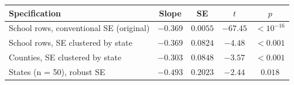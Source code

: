 \begin{tabular}{@{}lcccc@{}}
\toprule
Specification & Slope & SE & $t$ & $p$ \\
\midrule
School rows, conventional SE (original) & $-0.369$ & $0.0055$ & $-67.45$ & $<10^{-16}$ \\
School rows, SE clustered by state & $-0.369$ & $0.0824$ & $-4.48$ & $<0.001$ \\
Counties, SE clustered by state & $-0.303$ & $0.0848$ & $-3.57$ & $<0.001$ \\
States (n = 50), robust SE & $-0.493$ & $0.2023$ & $-2.44$ & $0.018$ \\
\bottomrule
\end{tabular}
